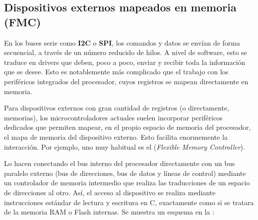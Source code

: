 \documentclass[../main.tex]{subfiles}
\begin{document}
    \subsection{Dispositivos externos mapeados en memoria (FMC)}

        En los buses serie como \textbf{I2C} o \textbf{SPI}, los comandos y datos se envían de forma secuencial, a través de un número reducido de hilos. A nivel de software, esto se traduce en drivers que deben, poco a poco, enviar y recibir toda la información que se desee. Esto es notablemente más complicado que el trabajo con los periféricos integrados del procesador, cuyos registros se mapean directamente en memoria.

        Para dispositivos externos con gran cantidad de registros (o directamente, memorias), los microcontroladores actuales suelen incorporar periféricos dedicados que permiten mapear, en el propio espacio de memoria del procesador, el mapa de memoria del dispositivo externo. Esto facilita enormemente la interacción. Por ejemplo, uno muy habitual es el  (\emph{Flexible Memory Controller}).

        Lo hacen conectando el bus interno del procesador directamente con un bus paralelo externo (bus de direcciones, bus de datos y líneas de control) mediante un controlador de memoria intermedio que realiza las traducciones de un espacio de direcciones al otro. Así, el acceso al dispositivo se realiza mediante instrucciones estándar de lectura y escritura en C, exactamente como si se tratara de la memoria RAM o Flash internas. Se muestra un esquema en la :
\end{document}
